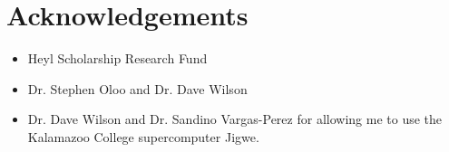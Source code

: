 \documentclass[a4paper,10pt]{article}
\theoremstyle{plain}
\theoremstyle{definition}
\theoremstyle{remark}
\begin{document}
\section{Acknowledgements}
\begin{itemize}
	\item Heyl Scholarship Research Fund
	\item Dr. Stephen Oloo and Dr. Dave Wilson
	\item Dr. Dave Wilson and Dr. Sandino Vargas-Perez for allowing me to use the Kalamazoo College supercomputer Jigwe.
\end{itemize}


\medskip

\end{document}

